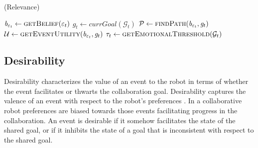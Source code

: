 \documentclass[letterpaper]{article}
\begin{document}
\begin{algorithm}
	\caption{(Relevance)}
	\label{alg:relevance}
	\begin{algorithmic}[1]
			\Statex
			\State $\mathit{b}_{\varepsilon_t} \gets \Call{getBelief}{\varepsilon_t}$
			\State $\mathit{g}_{t} \gets \textit{currGoal}{(\mathcal{G}_{t})}$
			\Statex
			\State $\mathcal{P} \gets \Call{findPath}{\mathit{b}_{\varepsilon_t},
			\mathit{g}_{t}}$
			\Statex
				\State {}
			\Else
				\State $\mathcal{U} \gets \Call{getEventUtility}{\mathit{b}_{\varepsilon_t},
				\mathit{g}_{t}}$ 
				\State $\tau_{t} \gets \Call{getEmotionalThreshold}{\mathcal{G}_{t}}$
				\State {}
				\Else
					\State {}
				\EndIf
			\EndIf
		\EndFunction
	\end{algorithmic}
\end{algorithm}

\subsection{Desirability}

Desirability characterizes the value of an event to the robot in terms of
whether the event facilitates or thwarts the collaboration goal. Desirability
captures the valence of an event with respect to the robot's preferences
\cite{gratch:domain-independent}. In a collaborative robot preferences are
biased towards those events facilitating progress in the collaboration. An event
is desirable if it somehow facilitates the state of the shared goal, or if it
inhibits the state of a goal that is inconsistent with respect to the shared
goal.
\end{document}
